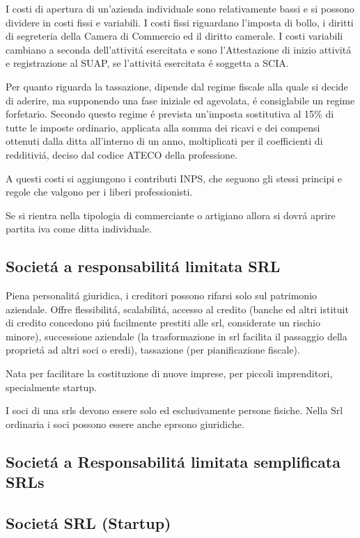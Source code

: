 \documentclass{article}
\begin{document}
I costi di apertura di un'azienda individuale sono relativamente bassi e si possono dividere in costi fissi e variabili. 
I costi fissi riguardano l'imposta di bollo, i diritti di segreteria della Camera di Commercio ed il diritto camerale. 
I costi variabili cambiano a seconda dell'attivit\'a esercitata e sono l'Attestazione di inizio attivit\'a e registrazione al SUAP, se l'attivit\'a esercitata \'e soggetta a SCIA.

Per quanto riguarda la tassazione, dipende dal regime fiscale alla quale si decide di aderire, ma supponendo una fase iniziale ed agevolata, \'e consiglabile un regime forfetario.
Secondo questo regime \'e prevista un'imposta sostitutiva al 15\% di tutte le imposte ordinario, applicata alla somma dei ricavi e dei compensi ottenuti dalla ditta all'interno di un anno, moltiplicati per il coefficienti di redditivi\'a, deciso dal codice ATECO della professione. 

A questi costi si aggiungono i contributi INPS, che seguono gli stessi principi e regole che valgono per i liberi professionisti.

Se si rientra nella tipologia di commerciante o artigiano allora si dovr\'a aprire partita iva come ditta individuale.

\subsection{Societ\'a a responsabilit\'a limitata SRL}
Piena personalit\'a  giuridica, i creditori possono rifarsi solo sul patrimonio aziendale. 
Offre flessibilit\'a, scalabilit\'a, 
accesso al credito (banche ed altri istituit di credito concedono pi\'u facilmente prestiti alle srl, considerate un rischio minore), 
successione aziendale (la trasformazione in srl facilita il passaggio della propriet\'a ad altri soci o eredi), tassazione (per pianificazione fiscale).

Nata per facilitare la costituzione di nuove imprese, per piccoli imprenditori, specialmente startup.

I soci di una srls devono essere solo ed esclusivamente persone fisiche. Nella Srl ordinaria i soci possono essere anche eprsono giuridiche.

\subsection{Societ\'a a Responsabilit\'a limitata semplificata SRLs}

\subsection{Societ\'a SRL (Startup)}
\end{document}
